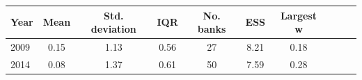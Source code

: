 \label{tab:bank_shocks_desc}
\begin{threeparttable}
\begin{tabular}{lccccccccc}
\toprule
\textbf{Year} & Mean & Std. deviation & IQR &  \textbf{No. banks} & \textbf{ESS} & \textbf{Largest w} \\
\midrule
2009 & 0.15 & 1.13 & 0.56 & 27 & 8.21 & 0.18 \\
2014 & 0.08 & 1.37 & 0.61 & 50 & 7.59 & 0.28 \\

\end{tabular}
\end{threeparttable}
